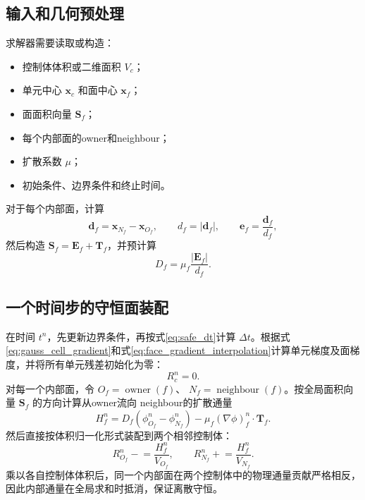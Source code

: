 \documentclass[UTF8,12pt,a4paper]{ctexart}
\numberwithin{equation}{section}
\newcommand{\Sf}{\bm S}
\newcommand{\xf}{\bm x}
\newcommand{\ef}{\bm e}
\newcommand{\Ef}{\bm E}
\newcommand{\Tf}{\bm T}
\begin{document}
\subsection{输入和几何预处理}

求解器需要读取或构造：
\begin{itemize}
  \item 控制体体积或二维面积 $V_c$；
  \item 单元中心 $\xf_c$ 和面中心 $\xf_f$；
  \item 面面积向量 $\Sf_f$；
  \item 每个内部面的owner和neighbour；
  \item 扩散系数 $\mu$；
  \item 初始条件、边界条件和终止时间。
\end{itemize}
对于每个内部面，计算
\begin{equation}
  \bm d_f=\xf_{N_f}-\xf_{O_f},
  \qquad
  d_f=|\bm d_f|,
  \qquad
  \ef_f=\frac{\bm d_f}{d_f},
  \label{eq:algorithm_geometry}
\end{equation}
然后构造 $\Sf_f=\Ef_f+\Tf_f$，并预计算
\begin{equation}
  D_f=\mu_f\frac{|\Ef_f|}{d_f}.
  \label{eq:precompute_D}
\end{equation}

\subsection{一个时间步的守恒面装配}

在时间 $t^n$，先更新边界条件，再按式\eqref{eq:safe_dt}计算 $\Delta t$。根据式\eqref{eq:gauss_cell_gradient}和式\eqref{eq:face_gradient_interpolation}计算单元梯度及面梯度，并将所有单元残差初始化为零：
\begin{equation}
  R_c^n=0.
  \label{eq:residual_zero}
\end{equation}
对每一个内部面，令 $O_f=\operatorname{owner}(f)$、
$N_f=\operatorname{neighbour}(f)$。按全局面积向量 $\Sf_f$ 的方向计算从owner流向
neighbour的扩散通量
\begin{equation}
  H_f^n
  =D_f(\phi_{O_f}^n-\phi_{N_f}^n)
  -\mu_f(\nabla\phi)_f^n\cdot\Tf_f.
  \label{eq:algorithm_face_flux}
\end{equation}
然后直接按体积归一化形式装配到两个相邻控制体：
\begin{equation}
  R_{O_f}^n\mathrel{-}=\frac{H_f^n}{V_{O_f}},
  \qquad
  R_{N_f}^n\mathrel{+}=\frac{H_f^n}{V_{N_f}}.
  \label{eq:owner_neighbour_assembly}
\end{equation}
乘以各自控制体体积后，同一个内部面在两个控制体中的物理通量贡献严格相反，
因此内部通量在全局求和时抵消，保证离散守恒。
\end{document}
